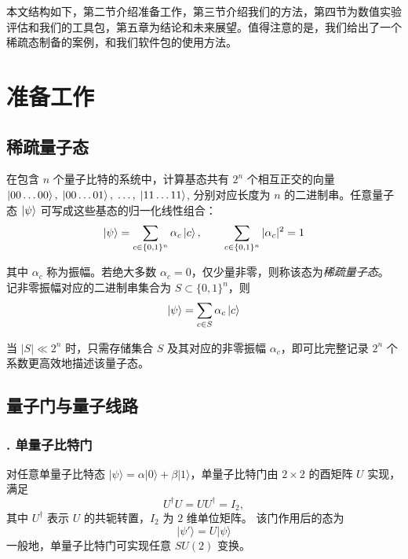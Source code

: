 \documentclass[10.5pt,compsoc,UTF8]{CjC}
\theoremstyle{mystyle}
\begin{document}
本文结构如下，第二节介绍准备工作，第三节介绍我们的方法，第四节为数值实验评估和我们的工具包，第五章为结论和未来展望。值得注意的是，我们给出了一个稀疏态制备的案例，和我们软件包的使用方法。




\section{\heiti 准备工作}
\subsection{\heiti 稀疏量子态}
在包含 $n$ 个量子比特的系统中，计算基态共有 $2^{n}$ 个相互正交的向量$\ket{00\dots00},\; \ket{00\dots01},\; \dots,\; \ket{11\dots11}$, 分别对应长度为 $n$ 的二进制串。任意量子态 $\ket{\psi}$ 可写成这些基态的归一化线性组合：
\begin{equation}
\ket{\psi} = \sum_{c\in\{0,1\}^{n}}\alpha_{c}\ket{c},\qquad
\sum_{c\in\{0,1\}^{n}}|\alpha_{c}|^{2}=1
\end{equation}
\par
其中 $\alpha_{c}$ 称为振幅。若绝大多数 $\alpha_{c}=0$，仅少量非零，则称该态为\textit{稀疏量子态}。
记非零振幅对应的二进制串集合为 $S\subset\{0,1\}^{n}$，则
\begin{equation}
\ket{\psi} = \sum_{c\in S}\alpha_{c}\ket{c}
\end{equation}

当 $|S|\ll 2^{n}$ 时，只需存储集合 $S$ 及其对应的非零振幅 $\alpha_{c}$，即可比完整记录 $2^{n}$ 个系数更高效地描述该量子态。

\subsection{\heiti 量子门与量子线路}


\subsubsection*{. 单量子比特门}
对任意单量子比特态 $|\psi\rangle=\alpha|0\rangle+\beta|1\rangle$，单量子比特门由 $2\times 2$ 的酉矩阵 $U$ 实现，满足
$$U^\dagger U = UU^\dagger = I_2,$$
其中 $U^\dagger$ 表示 $U$ 的共轭转置，$I_2$ 为 $2$ 维单位矩阵。
该门作用后的态为$$|\psi'\rangle = U|\psi\rangle
$$一般地，单量子比特门可实现任意 $SU(2)$ 变换。
\end{document}
